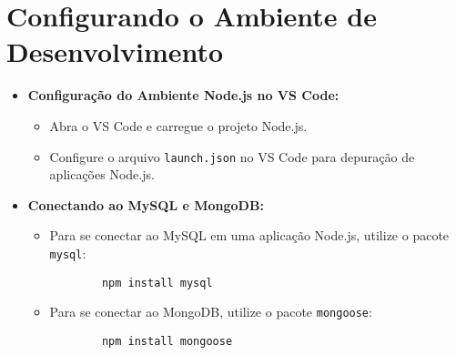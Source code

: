 \section{Configurando o Ambiente de Desenvolvimento}
\begin{itemize}
    \item \textbf{Configuração do Ambiente Node.js no VS Code:}
    \begin{itemize}
        \item Abra o VS Code e carregue o projeto Node.js.
        \item Configure o arquivo \texttt{launch.json} no VS Code para depuração de aplicações Node.js.
    \end{itemize}
    
    \item \textbf{Conectando ao MySQL e MongoDB:}
    \begin{itemize}
        \item Para se conectar ao MySQL em uma aplicação Node.js, utilize o pacote \texttt{mysql}:
        \begin{verbatim}
        npm install mysql
        \end{verbatim}
        
        \item Para se conectar ao MongoDB, utilize o pacote \texttt{mongoose}:
        \begin{verbatim}
        npm install mongoose
        \end{verbatim}
    \end{itemize}
\end{itemize}

